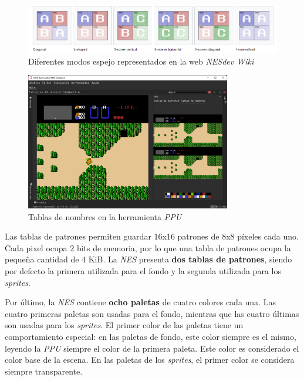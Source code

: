 \begin{figure}[h]
    \centering
    \includegraphics[width=\textwidth]{images/nes/nes-mirroring}
    \caption{Diferentes modos espejo representados en la web \textit{NESdev Wiki}}
    \label{fig:nes-mirroring}
\end{figure}

\begin{figure}[h]
    \centering
    \includegraphics[width=0.8\textwidth]{images/nes/nes-nametables}
    \caption{Tablas de nombres en la herramienta \textit{PPU}}
    \label{fig:nes-nametables}
\end{figure}

Las tablas de patrones permiten guardar 16x16 patrones de
8x8 píxeles cada uno.
Cada pixel ocupa 2 bits de memoria, por lo que una tabla
de patrones ocupa la pequeña cantidad de 4 KiB.
La \textit{NES} presenta \textbf{dos tablas de patrones}, siendo
por defecto la primera utilizada para el fondo y la segunda utilizada
para los \textit{sprites}.

Por último, la \textit{NES} contiene \textbf{ocho paletas}
de cuatro colores cada una.
Las cuatro primeras paletas son usadas para el fondo,
mientras que las cuatro últimas son usadas para los \textit{sprites}.
El primer color de las paletas tiene un comportamiento especial:
en las paletas de fondo, este color siempre es el mismo,
leyendo la \textit{PPU} siempre el color de la primera paleta.
Este color es considerado el color base de la escena.
En las paletas de los \textit{sprites}, el primer color
se considera siempre transparente.

